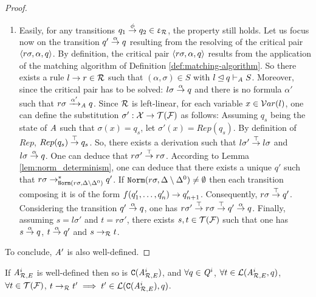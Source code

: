 \begin{proof}
\begin{enumerate}
    
\item \label{two} Easily, for any transitions $q_1\stackrel{\phi}{\rightarrow}
  q_2\in \upvarepsilon_{\mathcal R}$, the property still holds.  Let us focus now on the
  transition $q'\stackrel{\alpha}{\rightarrow}q$ resulting from the resolving
  of the critical pair $\langle r\sigma,\alpha,q\rangle$.  By definition, the
  critical pair $\langle r\sigma,\alpha,q\rangle$ results from the application
  of the matching algorithm of Definition
  \ref{def:matching-algorithm}.  So there exists a rule $l\rightarrow r\in \mathcal R$
  such that $(\alpha,\sigma)\in S$ with $l\unlhd q \vdash_\mathit A S
  $. Moreover, since the critical pair has to be solved:
  $l\sigma\stackrel{\alpha}{\rightarrow}q$ and there is no formula $\alpha'$
  such that $r\sigma \xrightarrow{\alpha'}_{\mathit A} q$.  Since $\mathcal R$ is
  left-linear, for each variable $x\in\mathcal{ V}ar(l)$, one can define the
  substitution $\sigma':\mathcal X\rightarrow \mathcal{T(F)}$ as follows: Assuming $q_s$ being the
  state of $\mathit A$ such that $\sigma(x)=q_s$, let $\sigma'(x)=Rep(q_s)$.
  By definition of $Rep$, $Rep(q_s)\stackrel{\top}{\rightarrow}q_s$.  So, there
  exists a derivation such that $l\sigma'\stackrel{\top}{\rightarrow}l\sigma$
  and $l\sigma\stackrel{\alpha}{\rightarrow}q$.  One can deduce that
  $r\sigma'\stackrel{\top}{\rightarrow}{r\sigma}$. According to Lemma
  \ref{lem:norm_determinism}, one can deduce that there exists a
  unique $q'$ such that
  $r\sigma\rightarrow^*_{\mathtt{Norm}(r\sigma,\Delta\setminus\Delta^0)}q'$. If
  $\mathtt{Norm}(r\sigma,\Delta\setminus\Delta^0)\not=\emptyset$ then each
  transition composing it is of the form $f(q'_1,\ldots,q'_n)\rightarrow
  q'_{n+1}$. Consequently, $r\sigma\stackrel{\top}{\rightarrow} q'$.
  Considering the transition $q'\stackrel{\alpha}{\rightarrow}{q}$, one has
  $r\sigma'\stackrel{\top}{\rightarrow}r\sigma\stackrel{\top}{\rightarrow}q'\stackrel{\alpha}{\rightarrow}{q}
  $.  Finally, assuming $s=l\sigma'$ and $t=r\sigma'$, there exists
  $s,t\in\mathcal{T(F)}$ such that one has $s\stackrel{\alpha}{\rightarrow}q $,
  $t\stackrel{\alpha}{\rightarrow}q' $ and $s\rightarrow_\mathcal R t $.

\end{enumerate}
To conclude, $\mathit A'$ is also well-defined.

\end{proof}



\setcounter{theorem}{9}


\begin{theorem}
  \label{thm:C}
  If ${\it A}_{\mathcal R,E}^i$ is well-defined then so is $\mathtt{C}({\it A}_{\mathcal R,E}^i)$, 
  and $\forall q \in \mathit Q^i$, $\forall t \in
  \mathcal{L}({\it A}_{\mathcal R,E}^i, q)$, $\forall t \in\mathcal{T(F)}$, $t \rightarrow_\mathcal R t' \; \Longrightarrow \; t' \in
  \mathcal{L}(\mathtt{C}({\it A}_{\mathcal R,E}^{i}), q)$.
\end{theorem}

